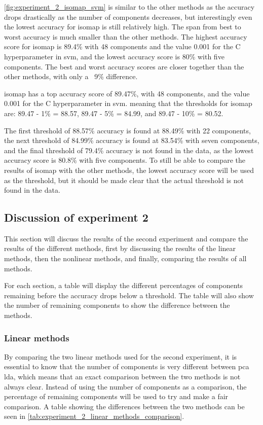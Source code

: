 \autoref{fig:experiment_2_isomap_svm} is similar to the other methods as the accuracy drops drastically as the number of components decreases, but interestingly even the lowest accuracy for \gls{isomap} is still relatively high. The span from best to worst accuracy is much smaller than the other methods. The highest accuracy score for \gls{isomap} is 89.4\% with 48 components and the value 0.001 for the C hyperparameter in \gls{svm}, and the lowest accuracy score is 80\% with five components. The best and worst accuracy scores are closer together than the other methods, with only a ~9\% difference.

isomap has a top accuracy score of 89.47\%, with 48 components, and the value 0.001 for the C hyperparameter in \gls{svm}. meaning that the thresholds for \gls{isomap} are: 89.47 - 1\% = 88.57, 89.47 - 5\% = 84.99, and 89.47 - 10\% = 80.52.

The first threshold of 88.57\% accuracy is found at 88.49\% with 22 components, the next threshold of 84.99\% accuracy is found at 83.54\% with seven components, and the final threshold of 79.4\% accuracy is not found in the data, as the lowest accuracy score is 80.8\% with five components. To still be able to compare the results of \gls{isomap}  with the other methods, the lowest accuracy score will be used as the threshold, but it should be made clear that the actual threshold is not found in the data.


\subsection{Discussion of experiment 2}\label{subsec:experiment_2_discussion}
This section will discuss the results of the second experiment and compare the results of the different methods, first by discussing the results of the linear methods, then the nonlinear methods, and finally, comparing the results of all methods.

For each section, a table will display the different percentages of components remaining before the accuracy drops below a threshold. The table will also show the number of remaining components to show the difference between the methods.


\subsubsection{Linear methods}
By comparing the two linear methods used for the second experiment, it is essential to know that the number of components is very different between \gls{pca} \gls{lda}, which means that an exact comparison between the two methods is not always clear. Instead of using the number of components as a comparison, the percentage of remaining components will be used to try and make a fair comparison. A table showing the differences between the two methods can be seen in \autoref{tab:experiment_2_linear_methods_comparison}.

